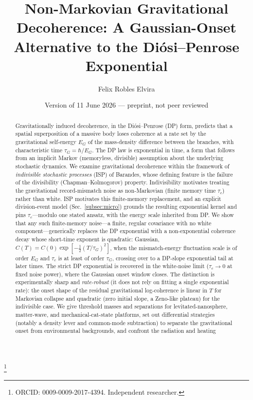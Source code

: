 \documentclass[aps,prd,onecolumn,amsmath,amssymb,nofootinbib,superscriptaddress]{revtex4-2}
\begin{document}
\title{Non-Markovian Gravitational Decoherence: A Gaussian-Onset Alternative to the
Di\'osi--Penrose Exponential}

\author{Felix Robles Elvira}
\thanks{ORCID: 0009-0009-2017-4394.  Independent researcher.}
\noaffiliation

\date{Version of 11 June 2026 --- preprint, not peer reviewed}

\begin{abstract}
Gravitationally induced decoherence, in the Di\'osi--Penrose (DP) form, predicts that a spatial
superposition of a massive body loses coherence at a rate set by the gravitational self-energy
$E_G$ of the mass-density difference between the branches, with characteristic time
$\tau_G=\hbar/E_G$. The DP law is exponential in time, a form that follows from an implicit
Markov (memoryless, divisible) assumption about the underlying stochastic dynamics. We examine
gravitational decoherence within the framework of \emph{indivisible stochastic processes} (ISP)
of Barandes, whose defining feature is the failure of the divisibility (Chapman--Kolmogorov)
property. Indivisibility motivates treating the gravitational record-mismatch noise as
non-Markovian (finite memory time $\tau_c$) rather than white. ISP motivates this finite-memory
replacement, and an explicit division-event model (Sec.~\ref{subsec:micro}) grounds the resulting
exponential kernel and pins $\tau_c$---modulo one stated ansatz, with the energy scale inherited
from DP. We show
that any such finite-memory noise---a finite, regular covariance with no white component---generically
replaces the DP exponential with a non-exponential coherence decay whose short-time exponent is
quadratic: Gaussian, $C(T)=C(0)\exp[-\tfrac12(T/\tau_G)^2]$, when the mismatch-energy fluctuation
scale is of order $E_G$ and $\tau_c$ is at least of order $\tau_G$, crossing over to a DP-slope
exponential tail at later times. The strict DP exponential is recovered in the white-noise limit
($\tau_c\to0$ at fixed noise power), where the Gaussian onset window closes. The distinction is
experimentally sharp and \emph{rate-robust} (it does not rely on fitting a single exponential
rate): the onset shape of the residual gravitational log-coherence is linear in $T$ for Markovian
collapse and quadratic (zero initial slope, a Zeno-like plateau) for the indivisible case. We give
threshold masses and separations for levitated-nanosphere, matter-wave, and mechanical-cat-state
platforms, set out differential strategies (notably a density lever and common-mode subtraction) to
separate the gravitational onset from environmental backgrounds, and confront the radiation and heating

\end{abstract}
\end{document}
